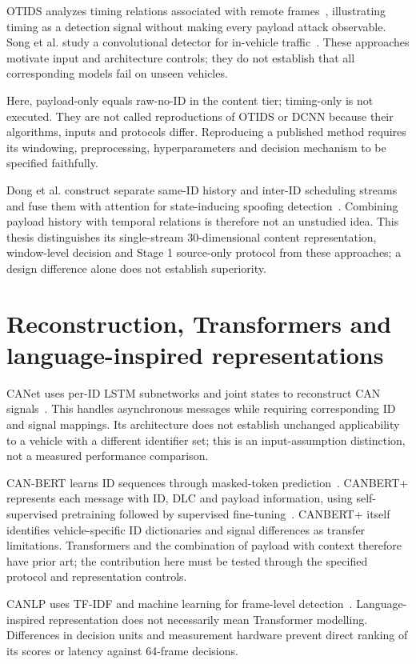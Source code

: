 \documentclass[12pt, a4paper, reqno, oneside]{book}
\begin{document}
OTIDS analyzes timing relations associated with remote frames~\cite{lee2017otids}, illustrating timing as a detection signal without making every payload attack observable. Song et al. study a convolutional detector for in-vehicle traffic~\cite{song2020dcnn}. These approaches motivate input and architecture controls; they do not establish that all corresponding models fail on unseen vehicles.

Here, payload-only equals raw-no-ID in the content tier; timing-only is not executed. They are not called reproductions of OTIDS or DCNN because their algorithms, inputs and protocols differ. Reproducing a published method requires its windowing, preprocessing, hyperparameters and decision mechanism to be specified faithfully.

Dong et al. construct separate same-ID history and inter-ID scheduling streams and fuse them with attention for state-inducing spoofing detection~\cite{dong2026mtff}. Combining payload history with temporal relations is therefore not an unstudied idea. This thesis distinguishes its single-stream 30-dimensional content representation, window-level decision and Stage 1 source-only protocol from these approaches; a design difference alone does not establish superiority.

\section{Reconstruction, Transformers and language-inspired representations}
CANet uses per-ID LSTM subnetworks and joint states to reconstruct CAN signals~\cite{hanselmann2020canet}. This handles asynchronous messages while requiring corresponding ID and signal mappings. Its architecture does not establish unchanged applicability to a vehicle with a different identifier set; this is an input-assumption distinction, not a measured performance comparison.

CAN-BERT learns ID sequences through masked-token prediction~\cite{alkhatib2022canbert}. CANBERT+ represents each message with ID, DLC and payload information, using self-supervised pretraining followed by supervised fine-tuning~\cite{won2026canbertplus}. CANBERT+ itself identifies vehicle-specific ID dictionaries and signal differences as transfer limitations. Transformers and the combination of payload with context therefore have prior art; the contribution here must be tested through the specified protocol and representation controls.

CANLP uses TF-IDF and machine learning for frame-level detection~\cite{balasubramanian2025canlp}. Language-inspired representation does not necessarily mean Transformer modelling. Differences in decision units and measurement hardware prevent direct ranking of its scores or latency against 64-frame decisions.
\end{document}
